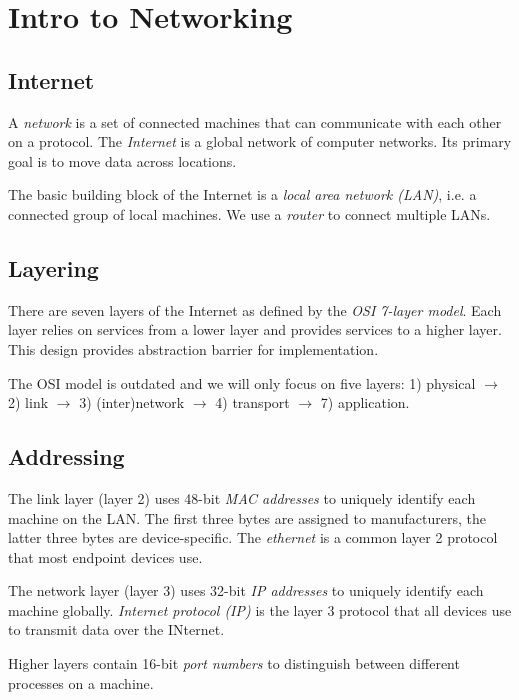 \chapter{Intro to Networking}

\section{Internet}
A \emph{network} is a set of connected machines that can communicate with each other on a protocol. The \emph{Internet} is a global network of computer networks. Its primary goal is to move data across locations.

\medskip
The basic building block of the Internet is a \emph{local area network (LAN)}, i.e. a connected group of local machines. We use a \emph{router} to connect multiple LANs.

\section{Layering}
There are seven layers of the Internet as defined by the \emph{OSI 7-layer model}. Each layer relies on services from a lower layer and provides services to a higher layer. This design provides abstraction barrier for implementation. 

\medskip
The OSI model is outdated and we will only focus on five layers: 1) physical $\rightarrow$ 2) link $\rightarrow$ 3) (inter)network $\rightarrow$ 4) transport $\rightarrow$ 7) application.

\section{Addressing}
The link layer (layer 2) uses 48-bit \emph{MAC addresses} to uniquely identify each machine on the LAN. The first three bytes are assigned to manufacturers, the latter three bytes are device-specific. The \emph{ethernet} is a common layer 2 protocol that most endpoint devices use. 

\medskip
The network layer (layer 3) uses 32-bit \emph{IP addresses} to uniquely identify each machine globally. \emph{Internet protocol (IP)} is the layer 3 protocol that all devices use to transmit data over the INternet.

\medskip
Higher layers contain 16-bit \emph{port numbers} to distinguish between different processes on a machine.